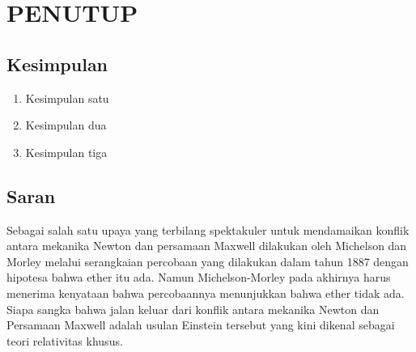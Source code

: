 \chapter{PENUTUP}

\section{Kesimpulan}
\begin{enumerate}
\item Kesimpulan satu
\item Kesimpulan dua
\item Kesimpulan tiga
\end{enumerate}  

\section{Saran}
Sebagai salah satu upaya yang terbilang spektakuler untuk mendamaikan konflik antara mekanika Newton dan persamaan Maxwell dilakukan oleh Michelson dan Morley melalui serangkaian percobaan yang dilakukan dalam tahun 1887 dengan hipotesa bahwa ether itu ada. Namun Michelson-Morley pada akhirnya harus menerima kenyataan bahwa percobaannya menunjukkan bahwa ether tidak ada. Siapa sangka bahwa jalan keluar dari konflik antara mekanika Newton dan Persamaan Maxwell adalah usulan Einstein tersebut yang kini dikenal sebagai teori relativitas khusus.

